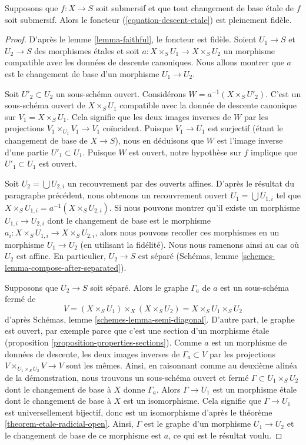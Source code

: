 \begin{lemma}
\label{lemma-fully-faithful}
Supposons que $f : X \to S$ soit submersif et que tout changement de base \'etale
de $f$ soit submersif. Alors le foncteur
(\ref{equation-descent-etale}) est pleinement fidèle.
\end{lemma}

\begin{proof}
D'après le lemme \ref{lemma-faithful}, le foncteur est fidèle.
Soient $U_1 \to S$ et $U_2 \to S$ des morphismes \'etales
et soit $a : X \times_S U_1 \to X \times_S U_2$ un
morphisme compatible avec les données de descente canoniques.
Nous allons montrer que $a$ est le changement de base d'un morphisme $U_1 \to U_2$.

\medskip\noindent
Soit $U'_2 \subset U_2$ un sous-schéma ouvert. Considérons
$W = a^{-1}(X \times_S U'_2)$. C'est un sous-schéma ouvert
de $X \times_S U_1$ compatible avec la donnée de descente
canonique sur $V_1 = X \times_S U_1$. Cela signifie que les
deux images inverses de $W$ par les projections
$V_1 \times_{U_1} V_1 \to V_1$ coïncident. Puisque $V_1 \to U_1$
est surjectif (étant le changement de base de $X \to S$), nous en déduisons
que $W$ est l'image inverse d'une partie $U'_1 \subset U_1$.
Puisque $W$ est ouvert, notre hypothèse sur $f$ implique que $U'_1 \subset U_1$
est ouvert.

\medskip\noindent
Soit $U_2 = \bigcup U_{2, i}$ un recouvrement par des ouverts affines.
D'après le résultat du paragraphe précédent, nous obtenons un recouvrement ouvert
$U_1 = \bigcup U_{1, i}$ tel que
$X \times_S U_{1, i} = a^{-1}(X \times_S U_{2, i})$.
Si nous pouvons montrer qu'il existe un morphisme $U_{1, i} \to U_{2, i}$
dont le changement de base est le morphisme
$a_i : X \times_S U_{1, i} \to X \times_S U_{2, i}$,
alors nous pouvons recoller ces morphismes en un morphisme $U_1 \to U_2$
(en utilisant la fidélité). Nous nous ramenons ainsi au cas où
$U_2$ est affine. En particulier, $U_2 \to S$ est séparé
(Schémas, lemme \ref{schemes-lemma-compose-after-separated}).

\medskip\noindent
Supposons que $U_2 \to S$ soit séparé. Alors le graphe $\Gamma_a$ de $a$
est un sous-schéma fermé de
$$
V = (X \times_S U_1) \times_X (X \times_S U_2) = X \times_S U_1 \times_S U_2
$$
d'après Schémas, lemme \ref{schemes-lemma-semi-diagonal}.
D'autre part, le graphe est ouvert, par exemple
parce que c'est une section d'un morphisme \'etale
(proposition \ref{proposition-properties-sections}).
Comme $a$ est un morphisme de données de descente, les deux images inverses de
$\Gamma_a \subset V$ par les projections
$V \times_{U_1 \times_S U_2} V \to V$ sont les mêmes.
Ainsi, en raisonnant comme au deuxième alinéa de la démonstration, nous
trouvons un sous-schéma ouvert et fermé $\Gamma \subset U_1 \times_S U_2$
dont le changement de base à $X$ donne $\Gamma_a$. Alors
$\Gamma \to U_1$ est un morphisme \'etale dont le changement de base
à $X$ est un isomorphisme. Cela signifie que $\Gamma \to U_1$
est universellement bijectif, donc est un isomorphisme
d'après le théorème \ref{theorem-etale-radicial-open}.
Ainsi, $\Gamma$ est le graphe d'un morphisme $U_1 \to U_2$
et le changement de base de ce morphisme est $a$, ce qui est le résultat voulu.
\end{proof}

